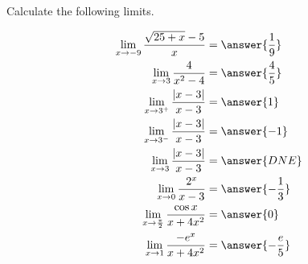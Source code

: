 \documentclass{ximera}
\author{Nela Lakos \and Kyle Parsons}
\begin{document}
\begin{exercise}

Calculate the following limits.

\begin{align*}
\lim_{x\to-9}\frac{\sqrt{25+x} -5}{x} &= \answer{\frac{1}{9}}\\
\lim_{x\to3}\frac{4}{x^2-4} &= \answer{\frac{4}{5}}\\
\lim_{x\to3^+}\frac{\left|x-3\right|}{x-3} &= \answer{1}\\
\lim_{x\to3^-}\frac{\left|x-3\right|}{x-3} &= \answer{-1}\\
\lim_{x\to3}\frac{\left|x-3\right|}{x-3} &= \answer{DNE}\\
\lim_{x\to0}\frac{2^x}{x-3} &= \answer{-\frac{1}{3}}\\
\lim_{x\to\frac{\pi}{2}} \frac{\cos x}{x+4x^2} &= \answer{{0}}\\
\lim_{x\to1}\frac{-e^x}{x+4x^2} &= \answer{-\frac{e}{5}}
\end{align*}

\end{exercise}
\end{document}
